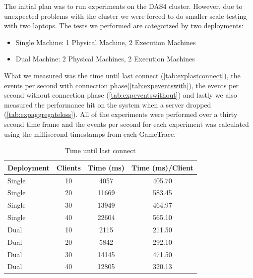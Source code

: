 \documentclass[a4paper,10pt]{article}
\begin{document}
The initial plan was to run experiments on the DAS4 cluster.
However, due to unexpected problems with the cluster we were forced to do smaller scale testing with two laptops.
The tests we performed are categorized by two deployments: 

\begin{itemize}
\item Single Machine: 1 Physical Machine, 2 Execution Machines
\item Dual Machine: 2 Physical Machines, 2 Execution Machines
\end{itemize}

What we measured was the time until last connect (\autoref{tab:explastconnect}), the  events per second with connection phase(\autoref{tab:expeventswith}),
the events per second without connection phase (\autoref{tab:expeventswithout}) and 
lastly we also measured the performance hit on the system when a server dropped (\autoref{tab:expaggregateloss}).
All of the experiments were performed over a thirty second time frame and the events per second for each experiment was calculated 
using the millisecond timestamps from each GameTrace.

\begin{table}
\centering
\begin{tabular}{| l | c | c | c |}
\hline
\textbf{Deployment} & \textbf{Clients} & \textbf{Time (ms)}  & \textbf{Time (ms)/Client} \\
\hline
\hline
Single & 10 & 4057 & 405.70\\
\hline
Single & 20 & 11669 &583.45 \\
\hline
Single & 30& 13949 & 464.97\\
\hline
Single & 40& 22604 & 565.10\\
\hline
\hline
Dual & 10 & 2115 &211.50 \\
\hline
Dual & 20 & 5842 &292.10 \\
\hline
Dual & 30 & 14145 &471.50 \\
\hline
Dual & 40 & 12805 &320.13 \\
\hline
\end{tabular}
\caption{Time until last connect}
\label{tab:explastconnect}
\end{table}
\end{document}
